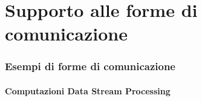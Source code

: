 \documentclass{beamer}
\begin{document}
\begin{frame}
\begin{columns}[c]
  \end{columns}
\end{frame}

\section{Supporto alle forme di comunicazione}

\begin{frame}
  \frametitle{Esempi di forme di comunicazione}
  \framesubtitle{Computazioni Data Stream Processing}
  \begin{figure}
  \end{figure}
\end{frame}
\end{document}
